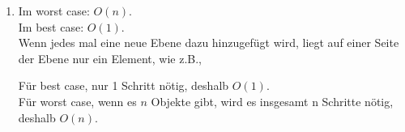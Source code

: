\documentclass[12pt]{scrartcl}
\begin{document}
\begin{enumerate}
  \item Im worst case: $O(n)$.\\
          Im best case: $O(1)$.\\
          Wenn jedes mal eine neue Ebene dazu hinzugefügt wird, liegt auf einer Seite der Ebene nur ein Element, wie z.B.,\\
          \begin{figure}[!h]
          \centering
          \end{figure}

          Für best case, nur 1 Schritt nötig, deshalb $O(1)$.\\
          Für worst case, wenn es $n$ Objekte gibt, wird es insgesamt n Schritte nötig, deshalb $O(n)$.\\
\Delta 
\end{enumerate}
\end{document}
